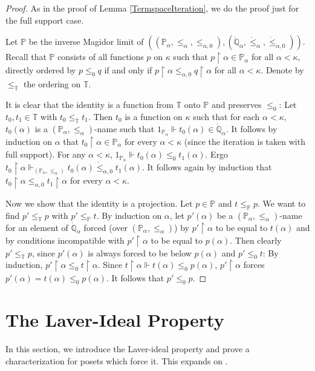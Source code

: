 \documentclass[a4paper]{amsart}
\theoremstyle{definition}
\theoremstyle{remark}
\theoremstyle{plain}
\numberwithin{mydef}{section}
\newcommand{\dP}{\mathbb{P}}
\newcommand{\dQ}{\mathbb{Q}}
\newcommand{\dT}{\mathbb{T}}
\newcommand{\uhr}{\upharpoonright}
\begin{document}
	\begin{proof}
		As in the proof of Lemma \ref{TermspaceIteration}, we do the proof just for the full support case.
		
		Let $\dP$ be the inverse Magidor limit of $((\dP_{\alpha},\leq_{\alpha},\leq_{\alpha,0}),(\dot{\dQ}_{\alpha},\dot{\leq}_{\alpha},\dot{\leq}_{\alpha,0}))$. Recall that $\dP$ consists of all functions $p$ on $\kappa$ such that $p\uhr\alpha\in\dP_{\alpha}$ for all $\alpha<\kappa$, directly ordered by $p\leq_0 q$ if and only if $p\uhr\alpha\leq_{\alpha,0}q\uhr\alpha$ for all $\alpha<\kappa$. Denote by $\leq_{\dT}$ the ordering on $\dT$.
		
		It is clear that the identity is a function from $\dT$ onto $\dP$ and preserves $\leq_0$: Let $t_0,t_1\in\dT$ with $t_0\leq_{\dT}t_1$. Then $t_0$ is a function on $\kappa$ such that for each $\alpha<\kappa$, $t_0(\alpha)$ is a $(\dP_{\alpha},\leq_{\alpha})$-name such that $1_{\dP_{\alpha}}\Vdash t_0(\alpha)\in\dot{\dQ}_{\alpha}$. It follows by induction on $\alpha$ that $t_0\uhr\alpha\in\dP_{\alpha}$ for every $\alpha<\kappa$ (since the iteration is taken with full support). For any $\alpha<\kappa$, $1_{\dP_{\alpha}}\Vdash t_0(\alpha)\leq_0t_1(\alpha)$. Ergo $t_0\uhr\alpha\Vdash_{(\dP_{\alpha},\leq_{\alpha})} t_0(\alpha)\dot{\leq}_{\alpha,0}t_1(\alpha)$. It follows again by induction that $t_0\uhr\alpha\leq_{\alpha,0}t_1\uhr\alpha$ for every $\alpha<\kappa$.
		
		Now we show that the identity is a projection. Let $p\in\dP$ and $t\leq_{\dP}p$. We want to find $p'\leq_{\dT}p$ with $p'\leq_{\dP}t$. By induction on $\alpha$, let $p'(\alpha)$ be a $(\dP_{\alpha},\leq_{\alpha})$-name for an element of $\dot{\dQ}_{\alpha}$ forced (over $(\dP_{\alpha},\leq_{\alpha})$) by $p'\uhr\alpha$ to be equal to $t(\alpha)$ and by conditions incompatible with $p'\uhr\alpha$ to be equal to $p(\alpha)$. Then clearly $p'\leq_{\dT}p$, since $p'(\alpha)$ is always forced to be below $p(\alpha)$ and $p'\leq_0t$: By induction, $p'\uhr\alpha\leq_0t\uhr\alpha$. Since $t\uhr\alpha\Vdash t(\alpha)\leq_0p(\alpha)$, $p'\uhr\alpha$ forces $p'(\alpha)=t(\alpha)\leq_0p(\alpha)$. It follows that $p'\leq_0p$.
	\end{proof}
	
	\section{The Laver-Ideal Property}
	
	In this section, we introduce the Laver-ideal property and prove a characterization for posets which force it. This expands on \cite[Section 3]{JakobLevineFailureApproachability}. 
	
\end{document}
